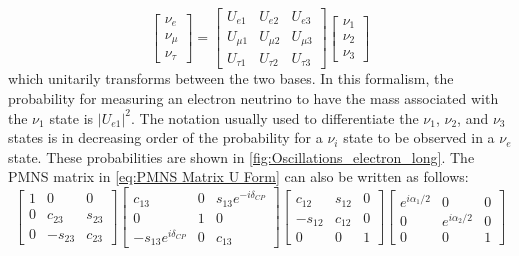 \begin{equation}\label{eq:PMNS Matrix U Form}
\begin{bmatrix}
\nu_{e} \\
\nu_{\mu} \\
\nu_{\tau}
\end{bmatrix}
=
  \begin{bmatrix}
    U_{e1} & U_{e2} & U_{e3} \\
    U_{\mu1} & U_{\mu2} & U_{\mu3} \\
    U_{\tau1} & U_{\tau2} & U_{\tau3}
  \end{bmatrix}
  \begin{bmatrix}
  	\nu_{1} \\
	\nu_{2} \\
	\nu_{3}
  \end{bmatrix}
  \end{equation}
which unitarily transforms between the two bases.
In this formalism, the probability for measuring an electron neutrino to have the mass associated with the $\nu_1$ state is $|U_{e1}|^2$. The notation usually used to differentiate the $\nu_1$, $\nu_2$, and $\nu_3$ states is in decreasing order of the probability for a $\nu_i$ state to be observed in a $\nu_e$ state.
These probabilities are shown in \autoref{fig:Oscillations_electron_long}.
The PMNS matrix in \autoref{eq:PMNS Matrix U Form} can also be written as follows: 
\begin{equation}\label{eq:PMNS Matrix Standard Form}
  \begin{bmatrix}
    1 & 0 & 0 \\
    0 & c_{23} & s_{23} \\
    0 & -s_{23} & c_{23}
  \end{bmatrix}
  \begin{bmatrix}
  c_{13} & 0 & s_{13}e^{-i\delta_{CP}} \\
  0 & 1 & 0 \\
  -s_{13}e^{i\delta_{CP}} & 0 & c_{13}
  \end{bmatrix}
  \begin{bmatrix}
  c_{12} & s_{12} & 0 \\
  -s_{12} & c_{12} & 0 \\
  0 & 0 & 1
  \end{bmatrix}
  \begin{bmatrix}
  e^{i\alpha_1/2} & 0 & 0 \\
  0 & e^{i\alpha_2/2} & 0 \\
  0 & 0 & 1
  \end{bmatrix}
\end{equation}
